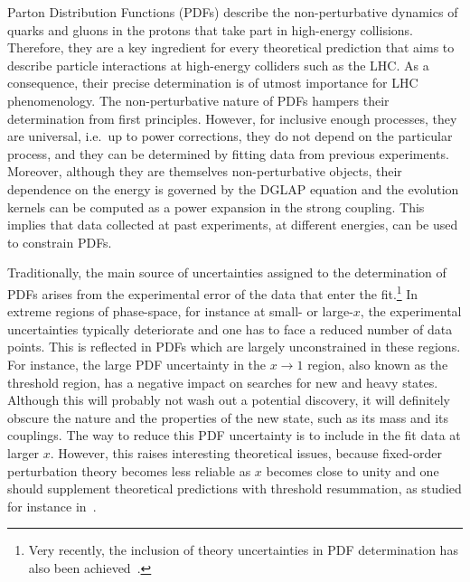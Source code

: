 Parton Distribution Functions (PDFs) describe the non-perturbative dynamics of quarks and gluons in the protons that take part in high-energy collisions. Therefore, they are a key ingredient for every theoretical prediction that aims to describe particle interactions at high-energy colliders such as the LHC. As a consequence, their precise determination is of utmost importance for LHC phenomenology. 
%
The non-perturbative nature of PDFs hampers their determination from first principles.
%
However, for inclusive enough processes, they are universal, i.e.\, up to power corrections, they do not depend on the particular process, and they can be determined by fitting data from previous experiments. Moreover, although they are themselves non-perturbative objects, their dependence on the energy is governed by the DGLAP equation and the evolution kernels can be computed as a power expansion in the strong coupling. This implies that data collected at past experiments, at different energies, can be used to constrain PDFs. 

Traditionally, the main source of uncertainties assigned to the determination of PDFs arises from the experimental error of the data that enter the fit.\footnote{Very recently, the inclusion of theory uncertainties in PDF determination has also been achieved~\cite{Harland-Lang:2018bxd,AbdulKhalek:2019ihb,AbdulKhalek:2019bux}.} In extreme regions of phase-space, for instance at small- or large-$x$, the experimental uncertainties typically deteriorate and one has to face a reduced number of data points. This is reflected in PDFs which are largely unconstrained in these regions. 
%
For instance, the large PDF uncertainty in the $x\to 1$ region, also known as the threshold region, has a negative impact on searches for new and heavy states.
%
 Although this will probably not wash out a potential discovery, it will definitely obscure the nature and the properties of the new state, such as its mass and its couplings. 
%
The way to reduce this PDF uncertainty is to include in the fit data at larger $x$. However, this raises interesting theoretical issues, because fixed-order perturbation theory becomes less reliable as $x$ becomes close to unity and one should supplement theoretical predictions with threshold resummation, as studied for instance in~\cite{Corcella:2005us,Sato:2013wea,Westmark:2013vea,Bonvini:2015ira,Accardi:2014qda}.


